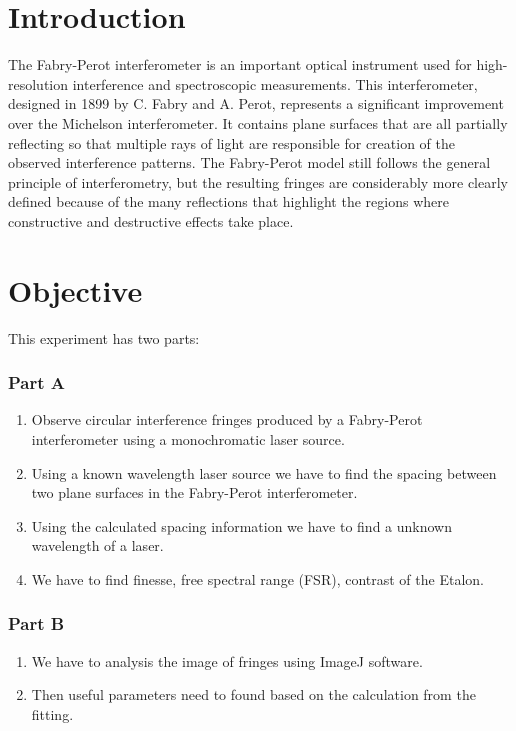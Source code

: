 
\renewcommand{\arraystretch}{1.5} %

\section{Introduction}
The Fabry-Perot interferometer is an important optical instrument used for high-resolution interference and spectroscopic measurements. This interferometer, designed in 1899 by C. Fabry and A. Perot, represents a significant improvement over the Michelson interferometer. It contains plane surfaces that are all partially reflecting so that multiple rays of light are responsible for creation of the observed interference patterns. The Fabry-Perot model still follows the general principle of interferometry, but the resulting fringes are considerably more clearly defined because of the many reflections that highlight the regions where constructive and destructive effects take place.
\section{Objective}
This experiment has two parts: 
\subsubsection*{Part A}
\begin{enumerate}
    \item Observe circular interference fringes produced by a Fabry-Perot interferometer using a monochromatic laser source.
    \item Using a known wavelength laser source we have to find the spacing between two plane surfaces in the Fabry-Perot interferometer.
    \item Using the calculated spacing information we have to find a unknown wavelength of a laser.
    \item We have to find finesse, free spectral range (FSR), contrast of the Etalon.
\end{enumerate}
\subsubsection*{Part B}
\begin{enumerate}
    \item We have to analysis the image of fringes using ImageJ software.
    \item Then useful parameters need to found based on the calculation from the fitting.
\end{enumerate}

